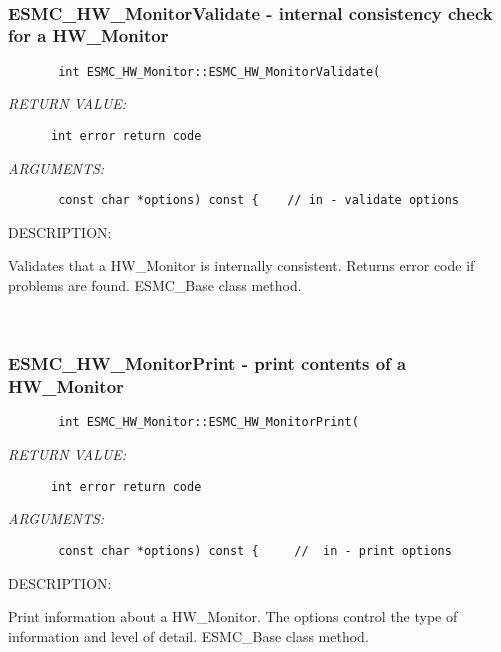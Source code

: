  
\mbox{}\hrulefill\ 
 
\subsubsection{ESMC\_HW\_MonitorValidate - internal consistency check for a HW\_Monitor}


  
\begin{verbatim}       int ESMC_HW_Monitor::ESMC_HW_MonitorValidate(\end{verbatim}{\em RETURN VALUE:}
\begin{verbatim}      int error return code\end{verbatim}{\em ARGUMENTS:}
\begin{verbatim}       const char *options) const {    // in - validate options\end{verbatim}
{\sf DESCRIPTION:\\ }


        Validates that a HW_Monitor is internally consistent.
        Returns error code if problems are found.  ESMC_Base class method.
   
 
\mbox{}\hrulefill\ 
 
\subsubsection{ESMC\_HW\_MonitorPrint - print contents of a HW\_Monitor}


  
\begin{verbatim}       int ESMC_HW_Monitor::ESMC_HW_MonitorPrint(\end{verbatim}{\em RETURN VALUE:}
\begin{verbatim}      int error return code\end{verbatim}{\em ARGUMENTS:}
\begin{verbatim}       const char *options) const {     //  in - print options\end{verbatim}
{\sf DESCRIPTION:\\ }


        Print information about a HW_Monitor.  The options control the
        type of information and level of detail.  ESMC_Base class method.
   
